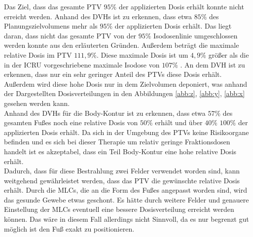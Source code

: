 Das Ziel, dass das gesamte PTV $95\%$ der applizierten Dosis erhält konnte nicht erreicht werden.
Anhand des DVHs ist zu erkennen, dass etwa $85\%$ des Planungszielvolumens mehr als $95\%$ der applizierten Dosis erhält.
Das liegt daran, dass nicht das gesamte PTV von der $95\%$ Isodosenlinie umgeschlossen werden konnte aus den erläuterten Gründen.
Außerdem beträgt die maximale relative Dosis im PTV $111,9 \%$. Diese maximale Dosis ist um $4,9\%$ größer
als die in der ICRU vorgeschriebene maximale Isodose von $107 \%$ \cite{ICRU}. An dem
DVH ist zu erkennen, dass nur ein sehr geringer Anteil des PTVs diese Dosis erhält.
Außerdem wird diese hohe Dosis nur in dem Zielvolumen deponiert, was anhand der
Dargestellten Dosisverteilungen in den Abbildungen \ref{abb:z}, \ref{abb:y}, \ref{abb:x} gesehen werden kann. \\

Anhand des DVHs für die Body-Kontur ist zu erkennen, dass etwa $57\%$ des gesamten Fußes noch eine
relative Dosis von $50\%$ erhält und über $40\%$ $100\%$ der applizierten Dosis erhält.
Da sich in der Umgebung des PTVs keine Risikoorgane befinden und es sich bei dieser
Therapie um relativ geringe Fraktionsdosen handelt ist es akzeptabel, dass
ein Teil Body-Kontur eine hohe relative Dosis erhält. \\

Dadurch, dass für diese Bestrahlung zwei Felder verwendet worden sind, kann
weitgehend gewährleistet werden, dass das PTV die gewünschte relative Dosis erhält.
Durch die MLCs, die an die Form des Fußes angepasst worden sind, wird das gesunde
Gewebe etwas geschont.
Es hätte durch weitere Felder und genauere Einstellung der MLCs eventuell eine bessere Dosisverteilung erreicht
werden können. Das wäre in diesem Fall allerdings nicht Sinnvoll, da es nur
begrenzt gut möglich ist den Fuß exakt zu positionieren.
